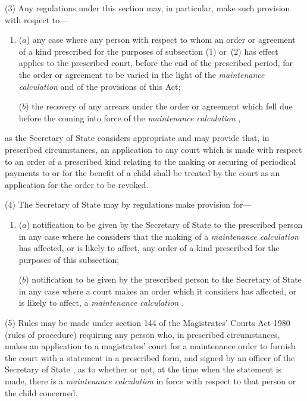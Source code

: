 \documentclass[12pt,a4paper]{article}
\begin{document}
(3) Any regulations under this section may, in particular, make such provision with respect to—
\begin{enumerate}\item[]
($a$) any case where any person with respect to whom an order or agreement of a kind prescribed for the purposes of subsection (1)  or~(2)  has effect applies to the prescribed court, before the end of the prescribed period, for the order or agreement to be varied in the light of the 
\emph{maintenance calculation}  %
and of the provisions of this Act;

($b$) the recovery of any arrears under the order or agreement which fell due before the coming into force of the 
\emph{maintenance calculation}%
,
\end{enumerate}
as the Secretary of State considers appropriate and may provide that, in prescribed circumstances, an application to any court which is made with respect to an order of a prescribed kind relating to the making or securing of periodical payments to or for the benefit of a child shall be treated by the court as an application for the order to be revoked.

(4) The Secretary of State may by regulations make provision for—
\begin{enumerate}\item[]
($a$) notification to be given by 
the Secretary of State  %
to the prescribed person in any case where 
he  %
considers that the making of a 
\emph{maintenance calculation}  %
has affected, or is likely to affect, any order of a kind prescribed for the purposes of this subsection;

($b$) notification to be given by the prescribed person to the Secretary of State in any case where a court makes an order which it considers has affected, or is likely to affect, a 
\emph{maintenance calculation}%
.
\end{enumerate}

(5) Rules may be made under section 144 of the Magistrates' Courts Act 1980 (rules of procedure) requiring any person who, in prescribed circumstances, makes an application to a magistrates' court for a maintenance order to furnish the court with a statement in a prescribed form, and signed by 
an officer of the Secretary of State%
, as to whether or not, at the time when the statement is made, there is a 
\emph{maintenance calculation}  %
in force with respect to that person or the child concerned.
\end{document}
